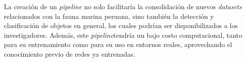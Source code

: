 La creación de un \textit{pipeline} no solo facilitaría la consolidación de 
nuevos \textit{datasets} relacionados con la fauna marina peruana, sino 
también la detección y clasificación de objetos en general, los cuales 
podrían ser disponibilizados a los investigadores. 
Además, este \textit{pipeline}tendría un bajo costo computacional, tanto 
para su entrenamiento como para su uso en entornos reales, aprovechando el 
conocimiento previo de redes ya entrenadas.